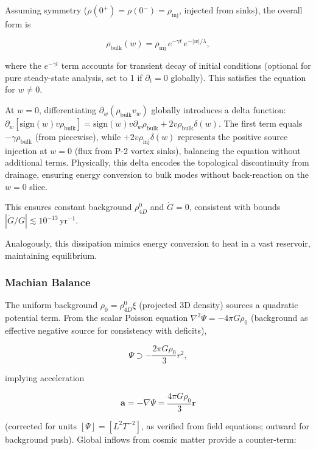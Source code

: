 Assuming symmetry ($\rho(0^+) = \rho(0^-) = \rho_{\text{inj}}$, injected from sinks), the overall form is

\begin{equation}
\rho_{\text{bulk}}(w) = \rho_{\text{inj}} \, e^{-\gamma t} \, e^{-|w| / \lambda},
\end{equation}

where the $e^{-\gamma t}$ term accounts for transient decay of initial conditions (optional for pure steady-state analysis, set to 1 if $\partial_t = 0$ globally). This satisfies the equation for $w \neq 0$.

At $w=0$, differentiating $\partial_w (\rho_{\text{bulk}} v_w)$ globally introduces a delta function: $\partial_w [\text{sign}(w) v \rho_{\text{bulk}}] = \text{sign}(w) v \partial_w \rho_{\text{bulk}} + 2 v \rho_{\text{bulk}} \delta(w)$. The first term equals $-\gamma \rho_{\text{bulk}}$ (from piecewise), while $+2 v \rho_{\text{inj}} \delta(w)$ represents the positive source injection at $w=0$ (flux from P-2 vortex sinks), balancing the equation without additional terms. Physically, this delta encodes the topological discontinuity from drainage, ensuring energy conversion to bulk modes without back-reaction on the $w=0$ slice.

This ensures constant background $\rho_{4D}^0$ and $\dot{G} = 0$, consistent with bounds $|\dot{G}/G| \lesssim 10^{-13} \, \mathrm{yr}^{-1}$.

Analogously, this dissipation mimics energy conversion to heat in a vast reservoir, maintaining equilibrium.

\subsubsection{Machian Balance}
The uniform background $\rho_0 = \rho_{4D}^0 \xi$ (projected 3D density) sources a quadratic potential term. From the scalar Poisson equation $\nabla^2 \Psi = -4\pi G \rho_0$ (background as effective negative source for consistency with deficits),

\[
\Psi \supset -\frac{2\pi G \rho_0}{3} r^2,
\]

implying acceleration

\begin{equation}
\mathbf{a} = -\nabla \Psi = \frac{4\pi G \rho_0}{3} \mathbf{r}
\end{equation}

(corrected for units $[\Psi] = [L^2 T^{-2}]$, as verified from field equations; outward for background push). Global inflows from cosmic matter provide a counter-term:

